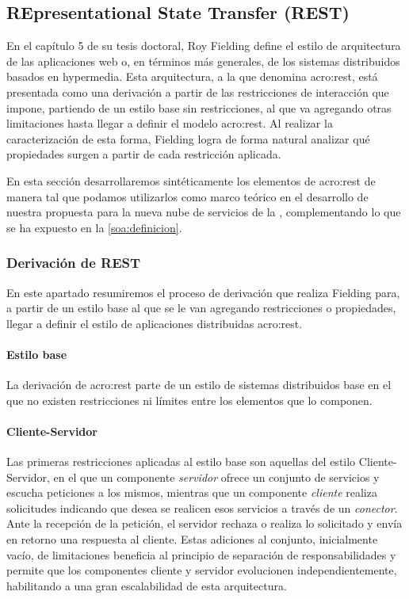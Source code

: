 \subsection{REpresentational State Transfer (REST)}
\label{standard:rest}

En el capítulo 5 de su tesis doctoral, Roy Fielding define el estilo de arquitectura de las aplicaciones web o, en términos más generales, de los sistemas distribuidos basados en hypermedia. Esta arquitectura, a la que denomina \gls{acro:rest}, está presentada como una derivación a partir de las restricciones de interacción que impone, partiendo de un estilo base sin restricciones, al que va agregando otras limitaciones hasta llegar a definir el modelo \gls{acro:rest}. Al realizar la caracterización de esta forma, Fielding logra de forma natural analizar qué propiedades surgen a partir de cada restricción aplicada.

En esta sección desarrollaremos sintéticamente los elementos de \gls{acro:rest} de manera tal que podamos utilizarlos como marco teórico en el desarrollo de nuestra propuesta para la nueva nube de servicios de la {\unlp}, complementando lo que se ha expuesto en la \autoref{soa:definicion}.


\subsubsection{Derivación de REST}
\label{standard:rest:derivacion}

En este apartado resumiremos el proceso de derivación que realiza Fielding para, a partir de un estilo base al que se le van agregando restricciones o propiedades, llegar a definir el estilo de aplicaciones distribuidas \gls{acro:rest}.

\paragraph{Estilo base}

La derivación de \gls{acro:rest} parte de un estilo de sistemas distribuidos base en el que no existen restricciones ni límites entre los elementos que lo componen.


\paragraph{Cliente-Servidor}

Las primeras restricciones aplicadas al estilo base son aquellas del estilo Cliente-Servidor\cite[Sec.~3.4.1]{tesis:fielding}, en el que un componente \textit{servidor} ofrece un conjunto de servicios y escucha peticiones a los mismos, mientras que un componente \textit{cliente} realiza solicitudes indicando que desea se realicen esos servicios a través de un \textit{conector}. Ante la recepción de la petición, el servidor rechaza o realiza lo solicitado y envía en retorno una respuesta al cliente.
Estas adiciones al conjunto, inicialmente vacío, de limitaciones beneficia al principio de separación de responsabilidades y permite que los componentes cliente y servidor evolucionen independientemente, habilitando a una gran escalabilidad de esta arquitectura.


